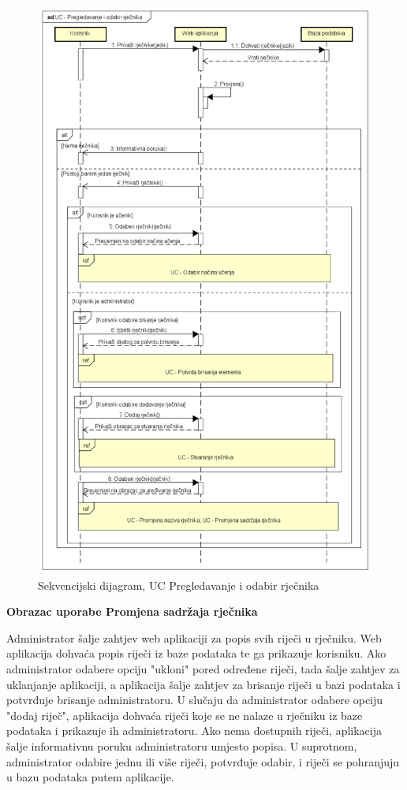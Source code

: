\begin{figure}[p]
	\includegraphics[scale=0.5]{dijagrami/UC - Pregledavanje i odabir rjecnika.png} 
	\centering
	\caption{Sekvencijski dijagram, UC Pregledavanje i odabir rječnika}
	\label{fig:uc-odabir-rjecnika}
\end{figure}


\textbf{{Obrazac uporabe Promjena sadržaja rječnika}}

Administrator šalje zahtjev web aplikaciji za popis svih riječi u rječniku. Web aplikacija dohvaća popis riječi iz baze podataka te ga prikazuje korisniku. Ako administrator odabere opciju "ukloni" pored određene riječi, tada šalje zahtjev za uklanjanje aplikaciji, a aplikacija šalje zahtjev za brisanje riječi u bazi podataka i potvrđuje brisanje administratoru. U slučaju da administrator odabere opciju "dodaj riječ", aplikacija dohvaća riječi koje se ne nalaze u rječniku iz baze podataka i prikazuje ih administratoru. Ako nema dostupnih riječi, aplikacija šalje informativnu poruku administratoru umjesto popisa. U suprotnom, administrator odabire jednu ili više riječi, potvrđuje odabir, i riječi se pohranjuju u bazu podataka putem aplikacije.

